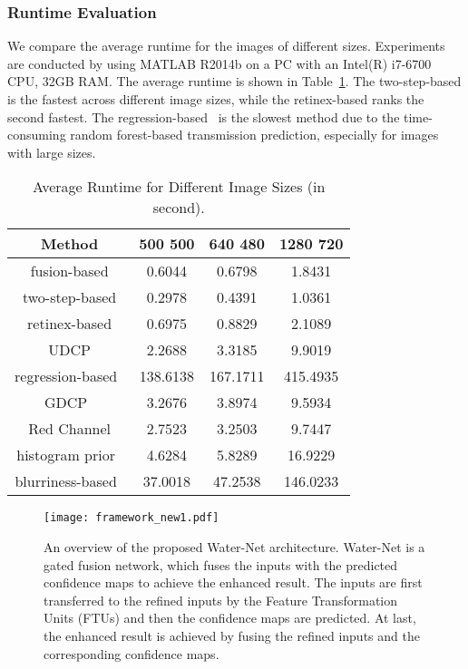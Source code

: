 \documentclass[journal]{IEEEtran}
\begin{document}
\subsubsection{Runtime Evaluation}

We compare the average runtime for the images of different sizes. Experiments are conducted by using MATLAB R2014b on a PC with an Intel(R) i7-6700 CPU, 32GB RAM. The average runtime is shown in Table~\ref{table_4}. The two-step-based \cite{Fu2017} is the fastest across different image sizes, while the retinex-based \cite{Fu2014} ranks the second fastest. The regression-based~\cite{Li2017prl} is the slowest method due to the time-consuming random forest-based transmission prediction, especially for images with large sizes.


\begin{table}[htbp]
\caption{Average Runtime for Different Image Sizes (in second).}
 \centering
\begin{tabular}{c|c|c|c}
  \hline
  \textbf{Method} &  \textbf{500  500} & \textbf{640  480} &  \textbf{1280  720}\\
  \hline
  fusion-based \cite{Ancuti2012} &  \textcolor[rgb]{0.00,0.07,1.00}{0.6044} & \textcolor[rgb]{0.00,0.07,1.00}{0.6798} & \textcolor[rgb]{0.00,0.07,1.00}{1.8431}\\
  two-step-based \cite{Fu2017} &\textcolor[rgb]{1.00,0.00,0.00}{0.2978}  & \textcolor[rgb]{1.00,0.00,0.00}{0.4391}& \textcolor[rgb]{1.00,0.00,0.00}{1.0361}\\
  retinex-based \cite{Fu2014}  &  0.6975 & 0.8829 & 2.1089\\
  UDCP \cite{Drews2016} &  2.2688 & 3.3185 & 9.9019\\
  regression-based~\cite{Li2017prl} & 138.6138 & 167.1711 & 415.4935\\
  GDCP~\cite{Peng2018}  & 3.2676& 3.8974& 9.5934\\
  Red Channel  \cite{Galdran2015}  & 2.7523& 3.2503 & 9.7447\\
  histogram prior~\cite{Li2016}  & 4.6284 &5.8289 &16.9229\\
  blurriness-based~\cite{Peng2017}   & 37.0018& 47.2538& 146.0233\\
  \hline
\end{tabular}
\vspace{\baselineskip}
\label{table_4}
\end{table}



\begin{figure*}[!htb]
\centering
\texttt{[image: framework\_new1.pdf]}
\caption{An overview of the proposed Water-Net architecture. Water-Net is a gated fusion network, which fuses the inputs with the predicted confidence maps to achieve the enhanced result. The inputs are first transferred to the refined inputs by the Feature Transformation Units (FTUs) and then the confidence maps are predicted. At last, the enhanced result is achieved by fusing the refined inputs and the corresponding confidence maps.}
\label{fig_9}
\end{figure*}
\end{document}

